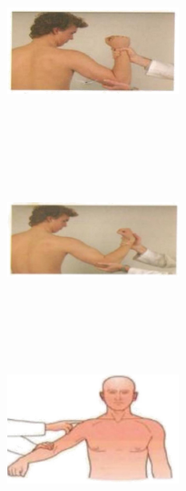 \documentclass[a4paper,12pt]{book}
\begin{document}
{\begin{figure}[H]
\begin{subfigure}[t]{.25\textwidth}
		\end{subfigure}
		\hspace{\fill}
		\begin{subfigure}[t]{.25\textwidth}
			\includegraphics[width=5cm,height=5cm]{./clinicalPhysioPic/motorSystem/flexorArm.jpg}
		\end{subfigure}
		\hspace{\fill}
		\begin{subfigure}[t]{.25\textwidth}
			\includegraphics[width=5cm,height=5cm]{./clinicalPhysioPic/motorSystem/extensorArm.jpg}
		\end{subfigure}
		\hspace{\fill}
		\begin{subfigure}[t]{.25\textwidth}
			\includegraphics[width=5cm,height=5cm]{./clinicalPhysioPic/motorSystem/deltoid.jpg}
		\end{subfigure}
		\hspace{\fill}

\end{figure}}
\end{document}
